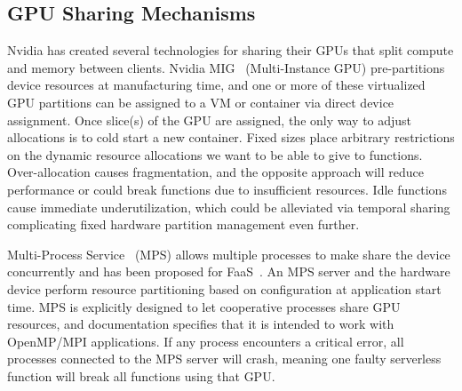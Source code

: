 \subsection{GPU Sharing Mechanisms}

Nvidia has created several technologies for sharing their GPUs that split compute and memory between clients.
Nvidia MIG~\cite{nvidia-mig} (Multi-Instance GPU) pre-partitions device resources at  manufacturing time, and one or more of these virtualized GPU partitions can be assigned to a VM or container via direct device assignment.
Once slice(s) of the GPU are assigned, the only way to adjust allocations is to cold start a new container.
Fixed sizes place arbitrary restrictions on the dynamic resource allocations we want to be able to give to functions.
Over-allocation causes fragmentation, and the opposite approach will reduce performance or could break functions due to insufficient resources.
Idle functions cause immediate underutilization, which could be alleviated via temporal sharing complicating fixed hardware partition management even further.

Multi-Process Service~\cite{nvidia-mps} (MPS) allows multiple processes to make share the device concurrently and has been proposed for FaaS~\cite{gu2023fast}.
An MPS server and the hardware device perform resource partitioning based on configuration at application start time.
MPS is explicitly designed to let cooperative processes share GPU resources, and documentation specifies that it is intended to work with OpenMP/MPI applications.
If any process encounters a critical error, all processes connected to the MPS server will crash, meaning one faulty serverless function will break all functions using that GPU.%

